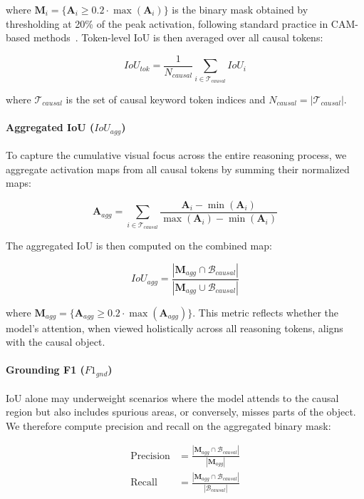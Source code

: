 \documentclass{article}
\begin{document}
where $\mathbf{M}_i = \{\mathbf{A}_i \geq 0.2 \cdot \max(\mathbf{A}_i)\}$ 
is the binary mask obtained by thresholding at 20\% of the 
peak activation, following standard practice in CAM-based 
methods~\cite{attention:grad-cam}. Token-level IoU is then 
averaged over all causal tokens:

\begin{equation}
IoU_{tok} = \frac{1}{N_{causal}} \sum_{i \in \mathcal{T}_{causal}} IoU_i
\end{equation}

where $\mathcal{T}_{causal}$ is the set of causal keyword 
token indices and $N_{causal} = |\mathcal{T}_{causal}|$.

\paragraph{Aggregated IoU ($IoU_{agg}$)}
To capture the cumulative visual focus across the entire 
reasoning process, we aggregate activation maps from all 
causal tokens by summing their normalized maps:

\begin{equation}
\mathbf{A}_{agg} = \sum_{i \in \mathcal{T}_{causal}} 
\frac{\mathbf{A}_i - \min(\mathbf{A}_i)}
{\max(\mathbf{A}_i) - \min(\mathbf{A}_i)}
\end{equation}

The aggregated IoU is then computed on the combined map:

\begin{equation}
IoU_{agg} = \frac{|\mathbf{M}_{agg} \cap \mathcal{B}_{causal}|}
{|\mathbf{M}_{agg} \cup \mathcal{B}_{causal}|}
\end{equation}

where $\mathbf{M}_{agg} = \{\mathbf{A}_{agg} \geq 0.2 \cdot 
\max(\mathbf{A}_{agg})\}$. This metric reflects whether the 
model's attention, when viewed holistically across all 
reasoning tokens, aligns with the causal object.

\paragraph{Grounding F1 ($F1_{gnd}$)}
IoU alone may underweight scenarios where the model attends 
to the causal region but also includes spurious areas, or 
conversely, misses parts of the object. We therefore compute 
precision and recall on the aggregated binary mask:

\begin{align}
\text{Precision} &= \frac{|\mathbf{M}_{agg} \cap \mathcal{B}_{causal}|}
{|\mathbf{M}_{agg}|} \\
\text{Recall} &= \frac{|\mathbf{M}_{agg} \cap \mathcal{B}_{causal}|}
{|\mathcal{B}_{causal}|}
\end{align}
\end{document}
